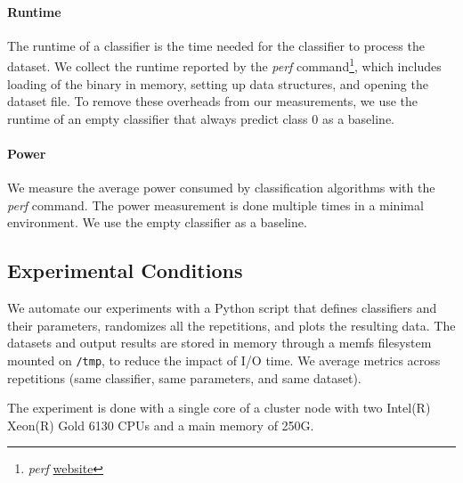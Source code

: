 \paragraph{Runtime}
The runtime of a classifier is the time needed for
the classifier to process the dataset. We
collect the runtime reported by the \textit{perf}
command\footnote{\textit{perf}
\href{https://perf.wiki.kernel.org/index.php/Main_Page}{website}}, which
includes loading of the binary in memory, setting up data structures, and
opening the dataset file. To remove these overheads from our measurements,
we use the runtime of an empty classifier that always predict class 0 as a baseline.

\paragraph{Power} We measure the average power consumed by classification
algorithms with the \textit{perf} command. The power measurement is done
multiple times in a minimal environment. We use the empty classifier as a
baseline.

\subsection{Experimental Conditions}
We automate our experiments with a Python script that defines
classifiers and their parameters, randomizes all
the repetitions, and plots the
resulting data. The datasets and output results are stored in memory
through a memfs filesystem mounted on \texttt{/tmp}, to reduce the impact of I/O time.
We average metrics across repetitions (same classifier, same parameters, and
same dataset).

The experiment is done with a single core of a
cluster node with two Intel(R) Xeon(R)
Gold 6130 CPUs and a main memory of 250G.

